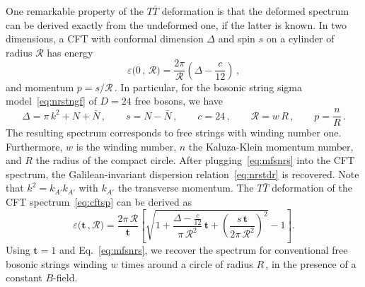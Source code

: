 \documentclass[11pt]{article}
\newcommand{\be}{\begin{equation}}
\newcommand{\ee}{\end{equation}}
\newcommand{\CR}{\mathcal{R}}
\newcommand{\lr}{\left (}
\newcommand{\rr}{\right )}
\newcommand{\ls}{\left [}
\newcommand{\rs}{\right ]}
\newcommand{\lambdap}{\boldsymbol{t}}
\begin{document}
One remarkable property of the $T\bar{T}$ deformation is that  the deformed spectrum can be derived exactly from the undeformed one, if the latter is known. In two dimensions, a CFT with conformal dimension $\Delta$ and spin $s$ on a cylinder of radius $\CR$ has energy
%
\be \label{eq:cftsp}
    \varepsilon \bigl( 0\,, \, \CR \bigr) = \frac{2\pi}{\CR} \left( \Delta - \frac{c}{12} \right)\,,
\ee
%
and momentum $p = s / \CR$\,. 
In particular, for the bosonic string sigma model~\eqref{eq:nrstngf} of $D=24$ free bosons, we have
%
\be \label{eq:mfsnrs}
    \Delta = \pi \, k^2 + N + \bar{N}\,,
        \qquad%
    s = N - \bar{N}\,,
        \qquad%
    c = 24\,,
        \qquad%
    \CR = w \, R\,,
        \qquad%
    p = \frac{n}{R}\,.
\ee
%
The resulting spectrum corresponds to free strings with winding number one. Furthermore, $w$ is the winding number, $n$ the Kaluza-Klein momentum number, and $R$ the radius of the compact circle. After plugging~\eqref{eq:mfsnrs} into the CFT spectrum, the Galilean-invariant dispersion relation~\eqref{eq:nrstdr} is recovered. Note that $k^2 = k_{A'} k_{A'}$ with $k_{A'}$ the transverse momentum. 
The $T\bar{T}$ deformation of the CFT spectrum~\eqref{eq:cftsp} can be derived as 
%
\be
    \varepsilon \bigl( \lambdap\,, \CR \bigr) = \frac{2 \pi \, \CR}{\lambdap} \ls \sqrt{1 + \frac{\Delta - \frac{c}{12}}{\pi \, \CR^2} \, \lambdap + \lr \frac{s \, \lambdap}{2 \pi \, \CR^2} \rr^{\!\!2}} - 1 \rs.
\ee
%
Using $\lambdap = 1$ and Eq.~\eqref{eq:mfsnrs}, we recover the spectrum for conventional free bosonic strings winding $w$ times around a circle of radius $R$\,, in the presence of a constant $B$-field. 
\end{document}
